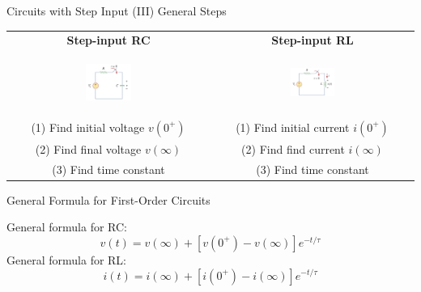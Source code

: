 \documentclass{beamer}
\begin{document}
\begin{frame}{Circuits with Step Input (III) General Steps}

\begin{table}[]
    \centering
    \setlength{\tabcolsep}{4mm}
    \begin{tabular}{c|c}
        \textbf{Step-input RC} & \textbf{Step-input RL}\\
        \begin{figure}
        \centering
        \includegraphics[width=0.35\textwidth]{img_1order/7_stepinputRC.png}
        \end{figure}
        &
        \begin{figure}
        \centering
        \includegraphics[width=0.34\textwidth]{img_1order/8_stepinputRL.png}
        \end{figure}
        \\

        (1) Find initial voltage $v(0^+)$ & (1) Find initial current $i(0^+)$\\
        (2) Find final voltage $v(\infty)$ & (2) Find find current $i(\infty)$\\
        (3) Find time constant & (3) Find time constant\\
    \end{tabular}
    
\end{table}


\end{frame}



\begin{frame}{General Formula for First-Order Circuits}


\color{red}
General formula for RC:
$$v(t) = v(\infty)+\left[v(0^+)-v(\infty)\right]e^{-t/\tau}$$
General formula for RL:
$$i(t) = i(\infty)+\left[i(0^+)-i(\infty)\right]e^{-t/\tau}$$
\color{black}

\end{frame}
\end{document}
